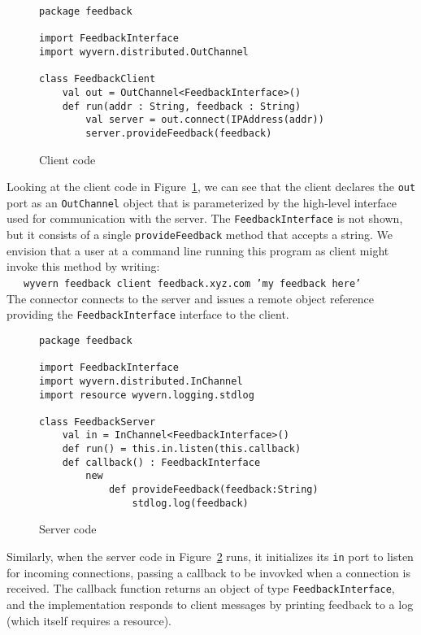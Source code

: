 \documentclass[runningheads]{llncs}
\begin{document}
\begin{sloppypar}
\begin{figure}[t]
\begin{lstlisting}
package feedback

import FeedbackInterface
import wyvern.distributed.OutChannel

class FeedbackClient
    val out = OutChannel<FeedbackInterface>()
    def run(addr : String, feedback : String)
        val server = out.connect(IPAddress(addr))
		server.provideFeedback(feedback)
\end{lstlisting}
\caption{Client code}
\label{f-client}
\end{figure}


Looking at the client code in Figure~\ref{f-client}, we can see that the client declares the \texttt{out} port as an \texttt{OutChannel} object that is parameterized by the high-level interface used for communication with the server.  The \texttt{FeedbackInterface} is not shown, but it consists of a single \texttt{provideFeedback} method that accepts a string.  We envision that a user at a command line running this program as client might invoke this method by writing:\\
~~~\texttt{wyvern feedback client feedback.xyz.com 'my feedback here'}\\
The connector connects to the server and issues a remote object reference providing the  \texttt{FeedbackInterface} interface to the client.


\begin{figure}[t]
\begin{lstlisting}
package feedback

import FeedbackInterface
import wyvern.distributed.InChannel
import resource wyvern.logging.stdlog

class FeedbackServer
    val in = InChannel<FeedbackInterface>()
    def run() = this.in.listen(this.callback)
    def callback() : FeedbackInterface
        new
            def provideFeedback(feedback:String)
                stdlog.log(feedback)

\end{lstlisting}
\caption{Server code}
\label{f-server}
\end{figure}


Similarly, when the server code in Figure~\ref{f-server} runs, it initializes its \texttt{in} port to listen for incoming connections, passing a callback to be invovked when a connection is received.  The callback function returns an object of type \texttt{FeedbackInterface}, and the implementation responds to client messages by printing feedback to a log (which itself requires a resource).



\end{sloppypar}
\end{document}
